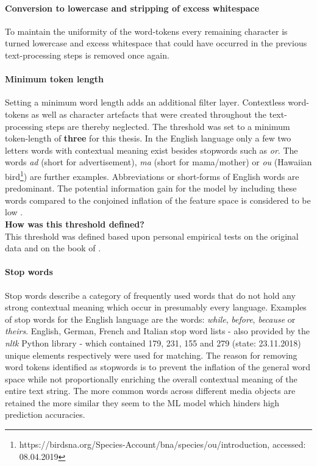\paragraph*{Conversion to lowercase and stripping of excess whitespace}
To maintain the uniformity of the word-tokens every remaining character is turned lowercase and excess whitespace that could have occurred in the previous text-processing steps is removed once again.

\paragraph*{Minimum token length}
Setting a minimum word length adds an additional filter layer. Contextless word-tokens as well as character artefacts that were created throughout the text-processing steps are thereby neglected. The threshold was set to a minimum token-length of \textbf{three} for this thesis. In the English language only a few two letters words with contextual meaning exist besides stopwords such as \textit{or}. The words \textit{ad} (short for advertisement), \textit{ma} (short for mama/mother) or \textit{ou} (Hawaiian bird\footnote{https://birdsna.org/Species-Account/bna/species/ou/introduction, accessed: 08.04.2019}) are further examples. Abbreviations or short-forms of English words are predominant. The potential information gain for the model by including these words compared to the conjoined inflation of the feature space is considered to be low \parencite{Guido2016}.\\
\newline
\textbf{How was this threshold defined?}\\
\newline
This threshold was defined based upon personal empirical tests on the original data and on the book of \textcite{Guido2016}.

\paragraph*{Stop words}
Stop words describe a category of frequently used words that do not hold any strong contextual meaning which occur in presumably every language. Examples of stop words for the English language are the words: \textit{while}, \textit{before}, \textit{because} or \textit{theirs}. English, German, French and Italian stop word lists - also provided by the \textit{nltk} Python library - which contained 179, 231, 155 and 279 (state: 23.11.2018) unique elements respectively were used for matching. The reason for removing word tokens identified as stopwords is to prevent the inflation of the general word space while not proportionally enriching the overall contextual meaning of the entire text string. The more common words across different media objects are retained the more similar they seem to the ML model which hinders high prediction accuracies.

